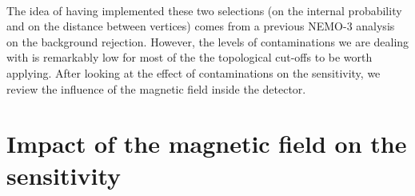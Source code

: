 \paragraph{}The idea of having implemented these two selections (on the internal probability and on the distance between vertices) comes from a previous NEMO-$3$ analysis on the background rejection.
However, the levels of contaminations we are dealing with is remarkably low for most of the the topological cut-offs to be worth applying.
After looking at the effect of contaminations on the sensitivity, we review the influence of the magnetic field inside the detector.

\section{Impact of the magnetic field on the sensitivity}
\label{sec:magnetic_field}

